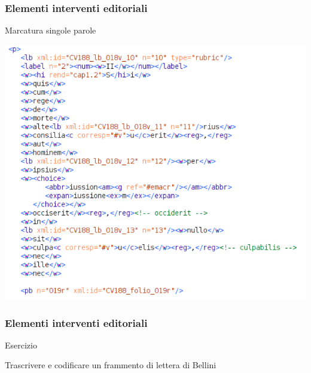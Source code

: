 \begin{frame}
    \frametitle{Elementi interventi editoriali}
    \addtocounter{nframe}{1}
    
   
    \begin{block}{Marcatura singole parole}
        \begin{center}
            \includegraphics[width=.9\textwidth]{imgs/MarcaturaParole.png}
        \end{center}
    \end{block}
    
\end{frame}

\begin{frame}
    \frametitle{Elementi interventi editoriali}
    \addtocounter{nframe}{1}
    
   
    \begin{block}{Esercizio}
        \begin{center}
            Trascrivere e codificare un frammento di lettera di Bellini
        \end{center}
    \end{block}
\end{frame}
